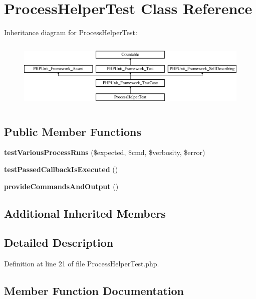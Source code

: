\section{Process\+Helper\+Test Class Reference}
\label{class_symfony_1_1_component_1_1_console_1_1_tests_1_1_helper_1_1_process_helper_test}
Inheritance diagram for Process\+Helper\+Test\+:\begin{figure}[H]
\begin{center}
\leavevmode
\includegraphics[height=3.303835cm]{class_symfony_1_1_component_1_1_console_1_1_tests_1_1_helper_1_1_process_helper_test}
\end{center}
\end{figure}
\subsection*{Public Member Functions}
\begin{DoxyCompactItemize}
\item 
{\bf test\+Various\+Process\+Runs} (\$expected, \$cmd, \$verbosity, \$error)
\item 
{\bf test\+Passed\+Callback\+Is\+Executed} ()
\item 
{\bf provide\+Commands\+And\+Output} ()
\end{DoxyCompactItemize}
\subsection*{Additional Inherited Members}


\subsection{Detailed Description}


Definition at line 21 of file Process\+Helper\+Test.\+php.



\subsection{Member Function Documentation}
